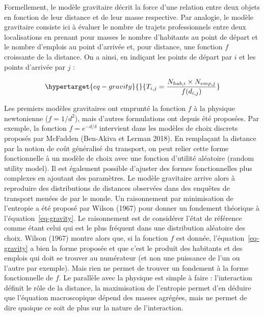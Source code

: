 \documentclass[
  10pt,
  a4paper,
  numbers=noendperiod,
  DIV=12]{scrartcl}
\begin{document}
Formellement, le modèle gravitaire décrit la force d'une relation entre
deux objets en fonction de leur distance et de leur masse respective.
Par analogie, le modèle gravitaire consiste ici à évaluer le nombre de
trajets professionnels entre deux localisations en prenant pour masses
le nombre d'habitants au point de départ et le nombre d'emplois au point
d'arrivée et, pour distance, une fonction \(f\) croissante de la
distance. On a ainsi, en indiçant les points de départ par \(i\) et les
points d'arrivée par \(j\) :

\begin{equation}\protect\hypertarget{eq-gravity}{}{
T_{i,j} = \frac {N_{hab, i}\times N_{emp, j}} {f(d_{i,j})}
}\label{eq-gravity}\end{equation}

Les premiers modèles gravitaires ont emprunté la fonction \(f\) à la
physique newtonienne (\(f=1/d^2\)), mais d'autres formulations ont
depuis été proposées. Par exemple, la fonction \(f=e^{-d/\delta}\)
intervient dans les modèles de choix discrets proposés par McFadden
(Ben-Akiva et Lerman 2018). En remplaçant la distance par la notion de
coût généralisé du transport, on peut relier cette forme fonctionnelle à
un modèle de choix avec une fonction d'utilité aléatoire (random utility
model). Il est également possible d'ajuster des formes fonctionnelles
plus complexes en ajoutant des paramètres. Le modèle gravitaire arrive
alors à reproduire des distributions de distances observées dans des
enquêtes de transport menées de par le monde. Un raisonnement par
minimisation de l'entropie a été proposé par Wilson (1967) pour donner
un fondement théorique à l'équation~\ref{eq-gravity}. Le raisonnement
est de considérer l'état de référence comme étant celui qui est le plus
fréquent dans une distribution aléatoire des choix. Wilson (1967) montre
alors que, si la fonction \(f\) est donnée, l'équation~\ref{eq-gravity}
a bien la forme proposée et que c'est le produit des habitants et des
emplois qui doit se trouver au numérateur (et non une puissance de l'un
ou l'autre par exemple). Mais rien ne permet de trouver un fondement à
la forme fonctionnelle de \(f\). Le parallèle avec la physique est
simple à faire : l'interaction définit le rôle de la distance, la
maximisation de l'entropie permet d'en déduire que l'équation
macroscopique dépend des masses agrégées, mais ne permet de dire quoique
ce soit de plus sur la nature de l'interaction.
\end{document}
